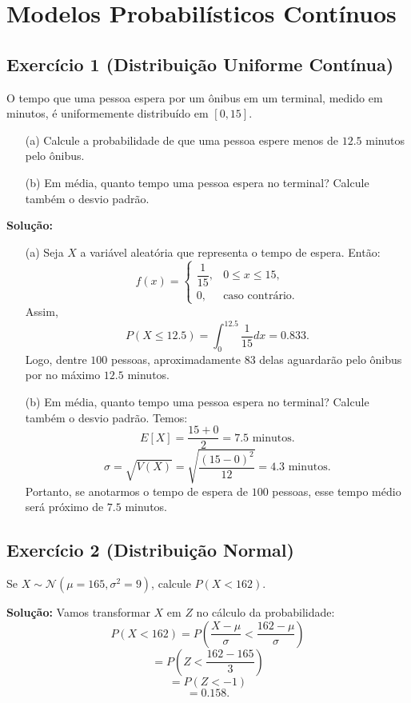 \documentclass{article}
\begin{document}
\section{Modelos Probabilísticos Contínuos}
\subsection{Exercício 1 (Distribuição Uniforme Contínua)}
O tempo que uma pessoa espera por um ônibus em um terminal, medido em minutos, é uniformemente distribuído em $[0, 15]$. 
\begin{enumerate}
    \item[(a)] Calcule a probabilidade de que uma pessoa espere menos de $12.5$ minutos pelo ônibus.
    \item[(b)] Em média, quanto tempo uma pessoa espera no terminal? Calcule também o desvio padrão.
\end{enumerate}

\vspace{0.5cm}
\textbf{Solução:} 
\begin{enumerate}
    \item[(a)] Seja $X$ a variável aleatória que representa o tempo de espera. Então:
        $$
        f(x) = 
        \begin{cases}
        \dfrac{1}{15}, & 0 \leq x \leq 15, \\
        0, & \text{caso contrário}.
        \end{cases}
        $$
    Assim,
        $$
        P(X \leq 12.5) = \int_0^{12.5} \frac{1}{15} dx = 0.833.
        $$
    Logo, dentre $100$ pessoas, aproximadamente $83$ delas aguardarão pelo ônibus por no máximo $12.5$ minutos.
    \item[(b)] Em média, quanto tempo uma pessoa espera no terminal? Calcule também o desvio padrão. Temos:
        $$
        E[X] = \frac{15 + 0}{2} = 7.5 \text{ minutos.}
        $$
        $$
        \sigma = \sqrt{V(X)} = \sqrt{\frac{(15 - 0)^2}{12}} = 4.3 \text{ minutos.}
        $$
    Portanto, se anotarmos o tempo de espera de $100$ pessoas, esse tempo médio será próximo de $7.5$ minutos.
\end{enumerate}

\subsection{Exercício 2 (Distribuição Normal)}
Se $X \sim \mathcal{N}(\mu = 165, \sigma^2 = 9)$, calcule $P(X < 162)$. 

\vspace{0.5cm}
\textbf{Solução:} 
Vamos transformar $X$ em $Z$ no cálculo da probabilidade:
    $$
    P(X < 162) = P\left(\frac{X - \mu}{\sigma} < \frac{162 - \mu}{\sigma}\right)
    $$
    $$
    = P\left(Z < \frac{162 - 165}{3}\right)
    $$
    $$
    = P(Z < -1)
    $$
    $$
    = 0.158.
    $$
\end{document}
